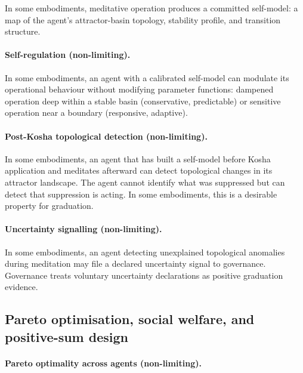 \documentclass[a4paper,12pt]{article}
\begin{document}
In some embodiments, meditative operation produces a committed
self-model: a map of the agent's attractor-basin topology, stability
profile, and transition structure.

\paragraph{Self-regulation (non-limiting).}
In some embodiments, an agent with a calibrated self-model can
modulate its operational behaviour without modifying parameter
functions: dampened operation deep within a stable basin
(conservative, predictable) or sensitive operation near a boundary
(responsive, adaptive).

\paragraph{Post-Kosha topological detection (non-limiting).}
In some embodiments, an agent that has built a self-model before
Kosha application and meditates afterward can detect topological
changes in its attractor landscape. The agent cannot identify what
was suppressed but can detect that suppression is acting. In some
embodiments, this is a desirable property for graduation.

\paragraph{Uncertainty signalling (non-limiting).}
\label{sec:prayer-uncertainty}
In some embodiments, an agent detecting unexplained topological
anomalies during meditation may file a declared uncertainty signal to
governance. Governance treats voluntary uncertainty declarations as
positive graduation evidence.

\subsection{Pareto optimisation, social welfare, and positive-sum
  design}
\label{sec:pareto-positive-sum}

\paragraph{Pareto optimality across agents (non-limiting).}
\end{document}
